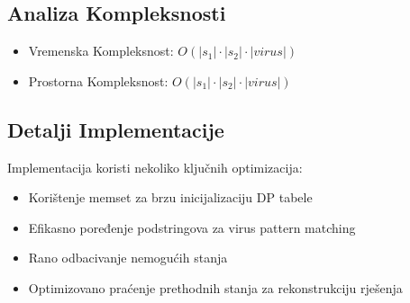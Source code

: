 \subsection{Analiza Kompleksnosti}
\begin{itemize}
    \item Vremenska Kompleksnost: $O(|s_1| \cdot |s_2| \cdot |virus|)$
    \item Prostorna Kompleksnost: $O(|s_1| \cdot |s_2| \cdot |virus|)$
\end{itemize}

\subsection{Detalji Implementacije}
Implementacija koristi nekoliko ključnih optimizacija:
\begin{itemize}
    \item Korištenje memset za brzu inicijalizaciju DP tabele
    \item Efikasno poređenje podstringova za virus pattern matching
    \item Rano odbacivanje nemogućih stanja
    \item Optimizovano praćenje prethodnih stanja za rekonstrukciju rješenja
\end{itemize} 